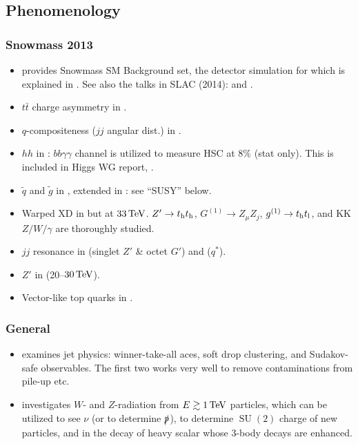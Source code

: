 \documentclass[10pt,a4paper]{article}
\newcommand{\TeV}{\,{\rm TeV}}
\newcommand{\s}[1]{_{\rm #1}}
\begin{document}
\subsection{Phenomenology}

\subsubsection{Snowmass 2013}
\begin{itemize}
  \item \cite{Avetisyan:2013onh} provides Snowmass SM Background set, the detector simulation for which is explained in \cite{Anderson:2013kxz}. See also the talks in SLAC (2014): \cite{SLACFCC2014:Selvaggi} and \cite{SLACFCC2014:Hirschauer}.

 \item $t\bar t$ charge asymmetry in \cite{Berge:2013csa}.
 \item $q$-compositeness ($jj$ angular dist.) in \cite{Apanasevich:2013cta}.
 \item $hh$ in \cite{Yao:2013ika}: $bb\gamma\gamma$ channel is utilized to measure HSC at $8\%$ (stat only). This is included in Higgs WG report, \cite{Dawson:2013bba}.

 \item $\tilde q$ and $\tilde g$ in \cite{Cohen:2013zla}, extended in \cite{Cohen:2013xda}: see ``SUSY'' below.
 \item Warped XD in \cite{Agashe:2013kyb} but at $33\TeV$. $Z'\to t\s{h}t\s{h}$, $G^{(1)}\to Z_\mu Z_j$, $g^{(1)}\to t\s{h}t\s{l}$, and KK $Z/W/\gamma$ are thoroughly studied.
 \item $jj$ resonance in \cite{Yu:2013wta} (singlet $Z'$ \& octet $G'$) and \cite{Anderson:2013ida} ($q^*$).
 \item $Z'$ in \cite{Godfrey:2013eta} (20--$30\TeV$).
 \item Vector-like top quarks in \cite{Andeen:2013zca}.
\end{itemize}

\subsubsection{General}
\begin{itemize}
 \item \cite{Larkoski:2014bia} examines jet physics: winner-take-all aces, soft drop clustering, and Sudakov-safe observables. The first two works very well to remove contaminations from pile-up etc.

 \item \cite{Hook:2014rka} investigates $W$- and $Z$-radiation from $E\gtrsim1\TeV$ particles, which can be utilized to see $\nu$ (or to determine $\slashed p$), to determine $\mathop{\mathrm{SU}}(2)$ charge of new particles, and in the decay of heavy scalar whose 3-body decays are enhanced.
\end{itemize}
\end{document}
